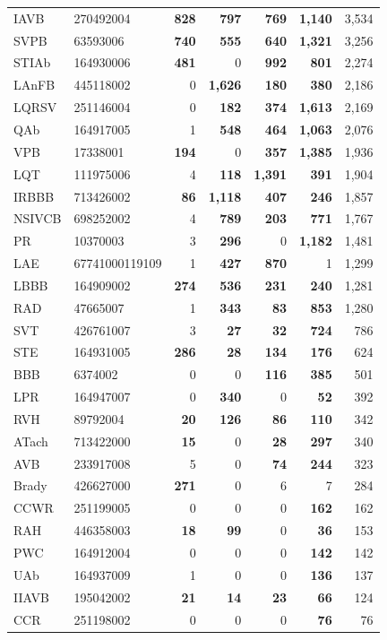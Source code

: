 \begin{longtable}{@{}llrrrrr@{}}
IAVB & 270492004 & \textbf{828} & \textbf{797} & \textbf{769} & \textbf{1{,}140} & 3{,}534 \\
SVPB & 63593006 & \textbf{740} & \textbf{555} & \textbf{640} & \textbf{1{,}321} & 3{,}256 \\
STIAb & 164930006 & \textbf{481} & 0 & \textbf{992} & \textbf{801} & 2{,}274 \\
LAnFB & 445118002 & 0 & \textbf{1{,}626} & \textbf{180} & \textbf{380} & 2{,}186 \\
LQRSV & 251146004 & 0 & \textbf{182} & \textbf{374} & \textbf{1{,}613} & 2{,}169 \\
QAb & 164917005 & 1 & \textbf{548} & \textbf{464} & \textbf{1{,}063} & 2{,}076 \\
VPB & 17338001 & \textbf{194} & 0 & \textbf{357} & \textbf{1{,}385} & 1{,}936 \\
LQT & 111975006 & 4 & \textbf{118} & \textbf{1{,}391} & \textbf{391} & 1{,}904 \\
IRBBB & 713426002 & \textbf{86} & \textbf{1{,}118} & \textbf{407} & \textbf{246} & 1{,}857 \\
NSIVCB & 698252002 & 4 & \textbf{789} & \textbf{203} & \textbf{771} & 1{,}767 \\
PR & 10370003 & 3 & \textbf{296} & 0 & \textbf{1{,}182} & 1{,}481 \\
LAE & 67741000119109 & 1 & \textbf{427} & \textbf{870} & 1 & 1{,}299 \\
LBBB & 164909002 & \textbf{274} & \textbf{536} & \textbf{231} & \textbf{240} & 1{,}281 \\
RAD & 47665007 & 1 & \textbf{343} & \textbf{83} & \textbf{853} & 1{,}280 \\
SVT & 426761007 & 3 & \textbf{27} & \textbf{32} & \textbf{724} & 786 \\
STE & 164931005 & \textbf{286} & \textbf{28} & \textbf{134} & \textbf{176} & 624 \\
BBB & 6374002 & 0 & 0 & \textbf{116} & \textbf{385} & 501 \\
LPR & 164947007 & 0 & \textbf{340} & 0 & \textbf{52} & 392 \\
RVH & 89792004 & \textbf{20} & \textbf{126} & \textbf{86} & \textbf{110} & 342 \\
ATach & 713422000 & \textbf{15} & 0 & \textbf{28} & \textbf{297} & 340 \\
AVB & 233917008 & 5 & 0 & \textbf{74} & \textbf{244} & 323 \\
Brady & 426627000 & \textbf{271} & 0 & 6 & 7 & 284 \\
CCWR & 251199005 & 0 & 0 & 0 & \textbf{162} & 162 \\
RAH & 446358003 & \textbf{18} & \textbf{99} & 0 & \textbf{36} & 153 \\
PWC & 164912004 & 0 & 0 & 0 & \textbf{142} & 142 \\
UAb & 164937009 & 1 & 0 & 0 & \textbf{136} & 137 \\
IIAVB & 195042002 & \textbf{21} & \textbf{14} & \textbf{23} & \textbf{66} & 124 \\
CCR & 251198002 & 0 & 0 & 0 & \textbf{76} & 76 \\
\end{longtable}
